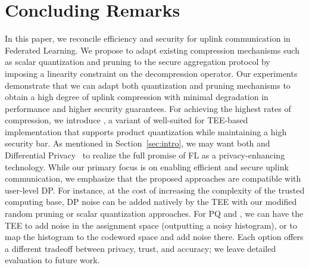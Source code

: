 \section{Concluding Remarks}
\label{sec:discussion}
In this paper, we reconcile efficiency and security for uplink communication in Federated Learning. 
We propose to adapt existing compression mechanisms such as scalar quantization and pruning to the secure aggregation protocol by imposing a linearity constraint on the decompression operator. 
Our experiments demonstrate that we can adapt both quantization and pruning mechanisms to obtain a high degree of uplink compression with minimal degradation in performance and higher security guarantees. For achieving the highest rates of compression, we introduce \SecInd, a variant of \SecAgg well-suited for TEE-based implementation that supports product quantization while maintaining a high security bar. 
As mentioned in Section~\ref{sec:intro}, we {may want } both \SecAgg and Differential Privacy~\citep{abadi2016deep} to realize the full promise of FL as a privacy-enhancing technology. 
While our primary focus is on enabling efficient and secure uplink communication, we emphasize that the proposed approaches are compatible with user-level DP. 
For instance, {at the cost of increasing the complexity of the trusted computing base}, DP noise can be added natively by the TEE with our modified random pruning or scalar quantization approaches. 
For PQ  and \SecInd, {we can have the TEE to add noise in the assignment space (\ie outputting a noisy histogram), or to map the histogram to the codeword space and add noise there.
Each option offers a different tradeoff between privacy, trust, and accuracy; we leave detailed evaluation to future work.}






